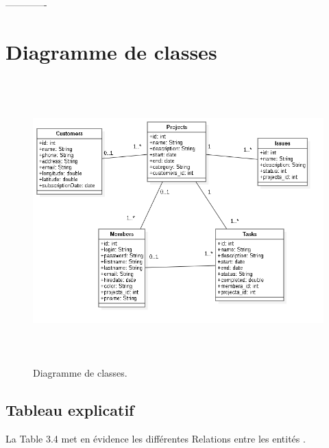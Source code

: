 -------------
\section{Diagramme de classes}

\begin{figure}[H]
\center
\includegraphics[width=13cm,height=11cm]{./figures/class.png}
\caption{Diagramme de classes.}

\end{figure}


\subsection{Tableau explicatif}

La Table 3.4 met en évidence les différentes Relations entre les entités .

